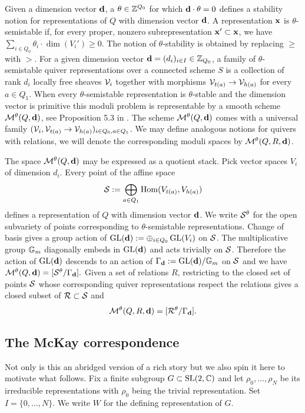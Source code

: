 \documentclass{amsart}
\theoremstyle{definition}
\newcommand\W{W}
\begin{document}
Given a dimension vector $\mathbf{d}$, a $\theta \in \mathbb{Z}^{Q_0}$ for which $\mathbf{d} \cdot \theta=0$ defines a stability notion for representations of $Q$ with dimension vector $\mathbf{d}$.
A representation $\mathbf{x}$ is $\theta$-semistable if, for every proper, nonzero subrepresentation $\mathbf{x}' \subset \mathbf{x}$, we have $\sum_{i \in Q_0} \theta_i \cdot \dim(V_i') \geq 0$.  
The notion of $\theta$-stability is obtained by replacing $\geq$ with $>$. 
For a given dimension vector $\mathbf{d} =(d_i)_{i \in I} \in \mathbb{Z}_{Q_0}$, a family of $\theta$-semistable quiver representations over a connected scheme $S$ is a collection of rank $d_i$ locally free sheaves $\mathcal{V}_i$ together with morphisms $\mathcal{V}_{t(a)} \rightarrow \mathcal{V}_{h(a)}$ for every $a\in Q_1$. 
When every $\theta$-semistable representation is $\theta$-stable and the dimension vector is primitive this moduli problem is representable by a smooth scheme $\mathcal{M}^\theta(Q, \mathbf{d})$, see Proposition 5.3 in \cite{Ki}.
The scheme $\mathcal{M}^\theta(Q, \mathbf{d})$ comes with a universal family $(\mathcal{V}_i, \mathcal{V}_{t(a)} \rightarrow \mathcal{V}_{h(a)})_{i \in Q_0, a \in Q_1}$. 
We may define analogous notions for quivers with relations, we will denote the corresponding moduli spaces by $\mathcal{M}^\theta(Q,R,\mathbf{d})$.

The space $\mathcal{M}^\theta(Q, \mathbf{d})$ may be expressed as a quotient stack.
Pick vector spaces $V_i$ of dimension $d_i$.
Every point of the affine space
$$\mathcal{S}:= \bigoplus_{a \in Q_1} \operatorname{Hom}(V_{t(a)}, V_{h(a)})$$
defines a representation of $Q$ with dimension vector $\mathbf{d}$.
We write $\mathcal{S}^\theta$ for the open subvariety of points corresponding to $\theta$-semistable representations.
Change of basis gives a group action of $\operatorname{GL}(\mathbf{d}):= \oplus_{i \in Q_0} \operatorname{GL}(V_i)$ on $\mathcal{S}$.
The multiplicative group $\mathbb{G}_m$ diagonally embeds in $\operatorname{GL}(\mathbf{d})$ and acts trivially on $\mathcal{S}$.
Therefore the action of $\operatorname{GL}(\mathbf{d})$ descends to an action of $\Gamma_{\mathbf{d}}:= \operatorname{GL}(\mathbf{d})/\mathbb{G}_m$ on $\mathcal{S}$ and we have $\mathcal{M}^\theta(Q, \mathbf{d}) = [\mathcal{S}^\theta / \Gamma_{\mathbf{d}}].$
Given a set of relations $R$, restricting to the closed set of points $\mathcal{S}$ whose corresponding quiver representations respect the relations gives a closed subset of $\mathcal{R} \subset \mathcal{S}$ and $$\mathcal{M}^\theta(Q,R,\mathbf{d})= [\mathcal{R}^\theta/\Gamma_{\mathbf{d}}].$$

\subsection{The McKay correspondence}\label{ssc:McKay}
Not only is this an abridged version of a rich story but we also spin it here to motivate what follows.
Fix a finite subgroup $G \subset \operatorname{SL}(2,\mathbb{C})$ and let $\rho_0, \ldots, \rho_N$ be its
irreducible representations with $\rho_0$ being the trivial representation.
Set $I=\{0,\ldots,N\}$.
We write $\W$ for the defining representation of $G$.
\end{document}
